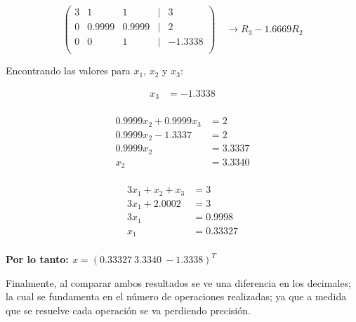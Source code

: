 \begin{enumerate}
            \[ \left( \begin{array}{ccccc}
                 3      & 1         & 1         & | & 3         \\
                 0      & 0.9999    & 0.9999    & | & 2         \\
                 0      & 0         & 1         & | & -1.3338   \\
            \end{array}
            \right) \quad \rightarrow R_3 - 1.6669R_2 
            \]
            
            Encontrando las valores para $x_1$, $x_2$ y $x_3$: 
            
            \begin{equation*}
                \begin{split}
                    x_3         & = -1.3338 \\
                \end{split}
            \end{equation*}
            
            \begin{equation*}
                \begin{split}
                    0.9999x_2 + 0.9999x_3   & = 2           \\
                    0.9999x_2 - 1.3337      & = 2           \\
                    0.9999x_2               & = 3.3337      \\
                    x_2                     & = 3.3340      \\
                \end{split}
            \end{equation*}
            
            \begin{equation*}
                \begin{split}
                    3x_1 + x_2 + x_3    & = 3           \\
                    3x_1 + 2.0002       & = 3           \\
                    3x_1                & = 0.9998      \\
                    x_1                 & = 0.33327     \\
                \end{split}
            \end{equation*}
            
            \textbf{Por lo tanto: $x = (0.33327 \ 3.3340 \ -1.3338)^T$}\\
        
    \end{enumerate}
    
    Finalmente, al comparar ambos resultados se ve una diferencia en los decimales; la cual se fundamenta en el número de operaciones realizadas; ya que a medida que se resuelve cada operación se va perdiendo precisión.
    